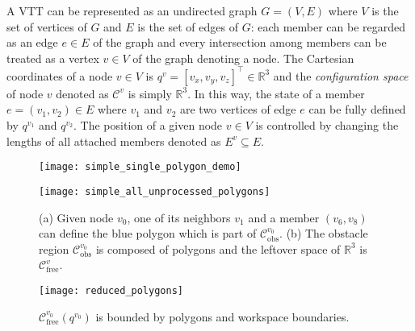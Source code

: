 \documentclass[journal]{IEEEtran}
\begin{document}
A VTT can be represented as an undirected graph $G=(V, E)$ where $V$
is the set of vertices of $G$ and $E$ is the set of edges of $G$: each
member can be regarded as an edge $e\in E$ of the graph and every
intersection among members can be treated as a vertex $v\in V$ of the
graph denoting a node. The Cartesian coordinates of a node $v\in V$ is
$q^v=[v_x, v_y, v_z]^\intercal\in \mathbb{R}^3$ and the
\textit{configuration space} of node $v$ denoted as $\mathcal{C}^v$ is
simply $\mathbb{R}^3$. In this way, the state of a member
$e = (v_1, v_2)\in E$ where $v_1$ and $v_2$ are two vertices of edge
$e$ can be fully defined by $q^{v_1}$ and $q^{v_2}$. The position of a
given node $v\in V$ is controlled by changing the lengths of all
attached members denoted as $E^v\subseteq E$.

\begin{figure}[b]
    \centering
    \begin{subfloat}[]{\texttt{[image: simple\_single\_polygon\_demo]}\label{fig:single-polygon}}
    \end{subfloat}
    \begin{subfloat}[]{\texttt{[image: simple\_all\_unprocessed\_polygons]}\label{fig:all-polygons-single-node}}
    \end{subfloat}
    \caption{(a) Given node $v_{0}$, one of its neighbors $v_{1}$ and
      a member $(v_{6}, v_{8})$ can define the blue polygon which is
      part of $\mathcal{C}_{\mathrm{obs}}^{v_0}$. (b) The obstacle region
      $\mathcal{C}_{\mathrm{obs}}^{v_0}$ is composed of polygons and the
      leftover space of $\mathbb{R}^3$ is $\mathcal{C}_{\mathrm{free}}^v$.}
\end{figure}

\begin{figure}[b!]
  \centering
  \texttt{[image: reduced\_polygons]}
  \caption{$\mathcal{C}_{\mathrm{free}}^{v_0}(q^{v_0})$ is bounded by polygons
    and workspace boundaries.}
  \label{fig:bounded-c-free}
\end{figure}
\end{document}
